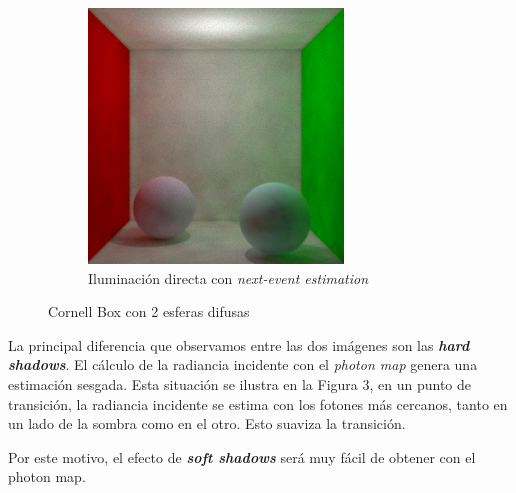 \documentclass{article}
\begin{document}
\begin{figure}
\begin{subfigure}[h]{0.4\linewidth}
\includegraphics[width=\linewidth]{imgs/pmdl.png}
\caption{Iluminación directa con \textit{next-event estimation}}
\end{subfigure}
\caption{Cornell Box con 2 esferas difusas}
\end{figure}

La principal diferencia que observamos entre las dos imágenes son las
\textbf{\textit{hard shadows}}. El cálculo de la radiancia incidente con el \textit{photon map} genera una estimación sesgada. Esta situación se ilustra en la Figura 3, en un punto de transición, la radiancia incidente se estima con los fotones más cercanos, tanto en un lado de la sombra como en el otro. Esto suaviza la transición.

Por este motivo, el efecto de \textbf{\textit{soft shadows}} será muy fácil de obtener con el photon map.
\end{document}
